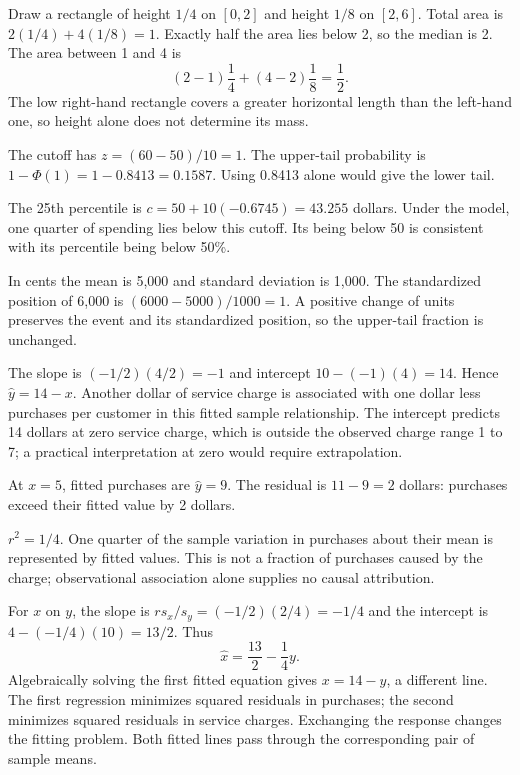 \documentclass[11pt]{article}
\begin{document}
\begin{parts}
\item Draw a rectangle of height $1/4$ on $[0,2]$ and height $1/8$ on $[2,6]$. Total area is $2(1/4)+4(1/8)=1$. Exactly half the area lies below 2, so the median is 2. The area between 1 and 4 is
\[(2-1)\frac14+(4-2)\frac18=\frac12.\]
The low right-hand rectangle covers a greater horizontal length than the left-hand one, so height alone does not determine its mass.
\item The cutoff has $z=(60-50)/10=1$. The upper-tail probability is $1-\Phi(1)=1-0.8413=0.1587$. Using 0.8413 alone would give the lower tail.
\item The 25th percentile is $c=50+10(-0.6745)=43.255$ dollars. Under the model, one quarter of spending lies below this cutoff. Its being below 50 is consistent with its percentile being below 50\%.
\item In cents the mean is 5,000 and standard deviation is 1,000. The standardized position of 6,000 is $(6000-5000)/1000=1$. A positive change of units preserves the event and its standardized position, so the upper-tail fraction is unchanged.
\end{parts}

\begin{parts}
\item The slope is $(-1/2)(4/2)=-1$ and intercept $10-(-1)(4)=14$. Hence $\widehat y=14-x$. Another dollar of service charge is associated with one dollar less purchases per customer in this fitted sample relationship. The intercept predicts 14 dollars at zero service charge, which is outside the observed charge range 1 to 7; a practical interpretation at zero would require extrapolation.
\item At $x=5$, fitted purchases are $\widehat y=9$. The residual is $11-9=2$ dollars: purchases exceed their fitted value by 2 dollars.
\item $r^2=1/4$. One quarter of the sample variation in purchases about their mean is represented by fitted values. This is not a fraction of purchases caused by the charge; observational association alone supplies no causal attribution.
\item For $x$ on $y$, the slope is $r s_x/s_y=(-1/2)(2/4)=-1/4$ and the intercept is $4-(-1/4)(10)=13/2$. Thus
\[\widehat x=\frac{13}{2}-\frac14 y.\]
Algebraically solving the first fitted equation gives $x=14-y$, a different line. The first regression minimizes squared residuals in purchases; the second minimizes squared residuals in service charges. Exchanging the response changes the fitting problem. Both fitted lines pass through the corresponding pair of sample means.
\end{parts}
\end{document}
